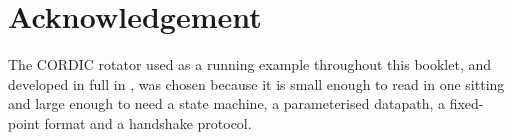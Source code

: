 \section*{Acknowledgement}

The CORDIC rotator used as a running example throughout this booklet, and
developed in full in , was chosen because it is small enough
to read in one sitting and large enough to need a state machine, a
parameterised datapath, a fixed-point format and a handshake protocol.
